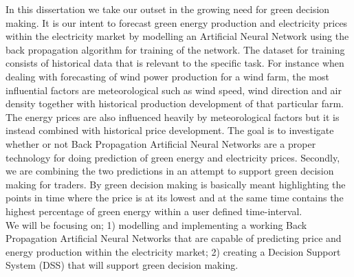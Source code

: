 In this dissertation we take our outset in the growing need for green decision making. It is our intent to forecast green energy production and electricity prices within the electricity market by modelling an Artificial Neural Network using the back propagation algorithm for training of the network. The dataset for training consists of historical data that is relevant to the specific task. For instance when dealing with forecasting of wind power production for a wind farm, the most influential factors are meteorological such as wind speed, wind direction and air density together with historical production development of that particular farm. The energy prices are also influenced heavily by meteorological factors but it is instead combined with historical price development.
The goal is to investigate whether or not Back Propagation Artificial Neural Networks are a proper technology for doing prediction of green energy and electricity prices. Secondly, we are combining the two predictions in an attempt to support green decision making for traders. By green decision making is basically meant highlighting the points in time where the price is at its lowest and at the same time contains the highest percentage of green energy within a user defined time-interval.
\\[0.5cm]
We will be focusing on; 1) modelling and implementing a working Back Propagation Artificial Neural Networks that are capable of predicting price and energy production within the electricity market; 2) creating a Decision Support System (DSS) that will support green decision making.